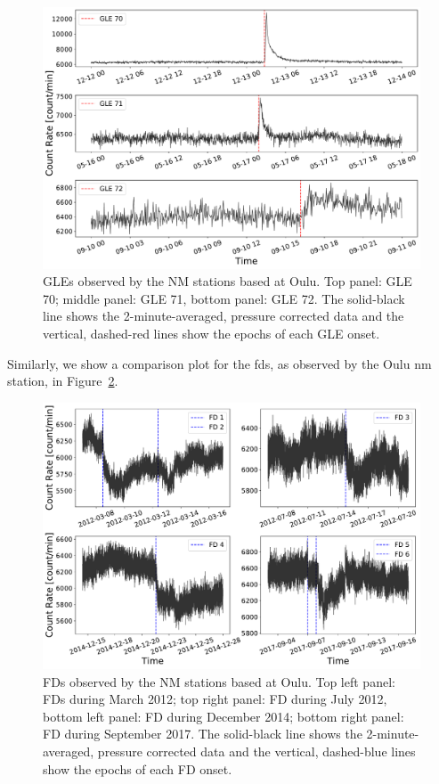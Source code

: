 \begin{figure}[ht!]
	\centering
	\includegraphics[width=0.75\columnwidth]{GLEs_OULU.pdf}
	\caption{GLEs observed by the NM stations based at Oulu. Top panel: GLE 70; middle panel: GLE 71, bottom panel: GLE 72. The solid-black line shows the 2-minute-averaged, pressure corrected data and the vertical, dashed-red lines show the epochs of each GLE onset.}
	\label{fig:oulu_gles}
\end{figure}

Similarly, we show a comparison plot for the \glspl{fd}, as observed by the Oulu \gls{nm} station, in Figure~\ref{fig:oulu_fds}.

\begin{figure}[ht!]
	\centering
	\includegraphics[width=0.75\columnwidth]{FDs_OULU.pdf}
	\caption{FDs observed by the NM stations based at Oulu. Top left panel: FDs during March 2012; top right panel: FD during July 2012, bottom left panel: FD during December 2014; bottom right panel: FD during September 2017. The solid-black line shows the 2-minute-averaged, pressure corrected data and the vertical, dashed-blue lines show the epochs of each FD onset.}
	\label{fig:oulu_fds}
\end{figure}

